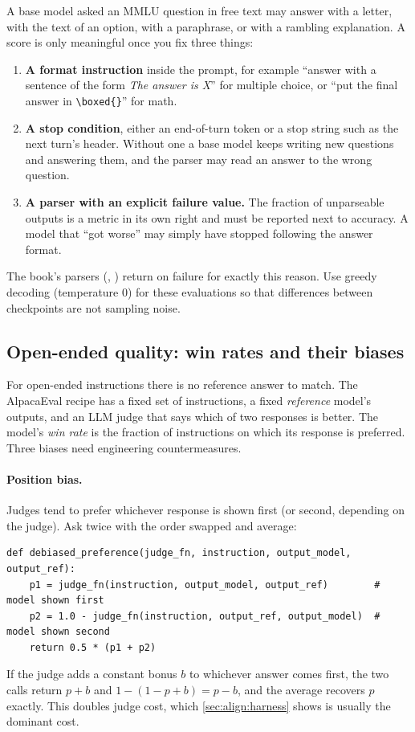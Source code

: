 A base model asked an MMLU question in free text may answer with a letter, with the text of an option,
with a paraphrase, or with a rambling explanation. A score is only meaningful once you fix
three things:
\begin{enumerate}
  \item \textbf{A format instruction} inside the prompt, for example ``answer with a sentence of
        the form \emph{The answer is X}'' for multiple choice, or ``put the final answer in
        \texttt{\textbackslash boxed\{\}}'' for math.
  \item \textbf{A stop condition}, either an end-of-turn token or a stop string such as the next
        turn's header. Without one a base model keeps writing new questions and answering them,
        and the parser may read an answer to the wrong question.
  \item \textbf{A parser with an explicit failure value.} The fraction of unparseable outputs is a
        metric in its own right and must be reported next to accuracy. A model that ``got worse''
        may simply have stopped following the answer format.
\end{enumerate}
The book's parsers (, ) return
 on failure for exactly this reason. Use greedy decoding (temperature 0) for these
evaluations so that differences between checkpoints are not sampling noise.

\subsection{Open-ended quality: win rates and their biases}

For open-ended instructions there is no reference answer to match. The AlpacaEval recipe has a
fixed set of instructions, a fixed \emph{reference} model's outputs, and an LLM judge that
says which of two responses is better. The model's \emph{win rate} is the fraction of
instructions on which its response is preferred. Three biases need engineering
countermeasures.

\paragraph{Position bias.} Judges tend to prefer whichever response is shown first (or second,
depending on the judge). Ask twice with the order swapped and average:
\begin{lstlisting}[caption={Cancelling first-order position bias by swapping presentation order.},label={lst:align:debias}]
def debiased_preference(judge_fn, instruction, output_model, output_ref):
    p1 = judge_fn(instruction, output_model, output_ref)        # model shown first
    p2 = 1.0 - judge_fn(instruction, output_ref, output_model)  # model shown second
    return 0.5 * (p1 + p2)
\end{lstlisting}
If the judge adds a constant bonus $b$ to whichever answer comes first, the two calls return
$p+b$ and $1-(1-p+b)=p-b$, and the average recovers $p$ exactly. This doubles judge cost, which
\cref{sec:align:harness} shows is usually the dominant cost.

